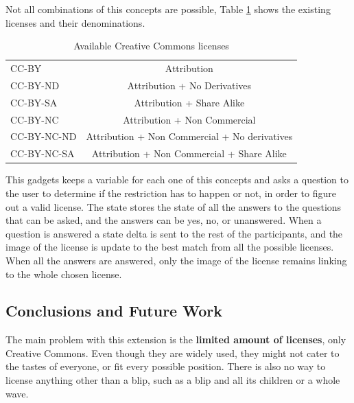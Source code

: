 Not all combinations of this concepts are possible, Table \ref{fig:cc_licenses} shows the existing licenses and their denominations.
\begin{table}[H]
  \begin{center}
    \begin{tabular}{ | l | c |}
      \hline
      CC-BY & Attribution\\
      CC-BY-ND & Attribution + No Derivatives\\      
      CC-BY-SA & Attribution + Share Alike\\
      CC-BY-NC & Attribution + Non Commercial\\
      CC-BY-NC-ND & Attribution + Non Commercial + No derivatives\\
      CC-BY-NC-SA & Attribution + Non Commercial + Share Alike\\
      \hline
    \end{tabular}
  \end{center}
  \caption{Available Creative Commons licenses}
  \label{fig:cc_licenses}
\end{table}
This gadgets keeps a variable for each one of this concepts and asks a question to the user to determine if the restriction has to happen or not, in order to figure out a valid license. The state stores the state of all the answers to the questions that can be asked, and the answers can be yes, no, or unanswered. When a question is answered a state delta is sent to the rest of the participants, and the image of the license is update to the best match from all the possible licenses. When all the answers are answered, only the image of the license remains linking to the whole chosen license.\\[.2cm]
\subsection{Conclusions and Future Work}
The main problem with this extension is the \textbf{limited amount of licenses}, only Creative Commons. Even though they are widely used, they might not cater to the tastes of everyone, or fit every possible position. There is also no way to license anything other than a blip, such as a blip and all its children or a whole wave.
